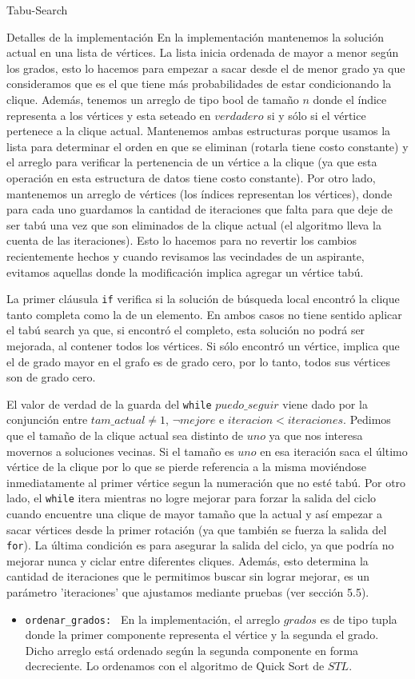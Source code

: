 \begin{section}{Tabu-Search}
\begin{subsection}{Detalles de la implementación}
		En la implementación mantenemos la solución actual en una lista de vértices. La lista inicia ordenada de mayor a menor según los grados, esto lo hacemos para empezar a sacar desde el de menor grado ya que consideramos que es el que tiene más probabilidades de estar condicionando la clique. Además, tenemos un arreglo de tipo bool de tamaño $n$ donde el índice representa a los vértices y esta seteado en $verdadero$ si y sólo si el vértice pertenece a la clique actual. Mantenemos ambas estructuras porque usamos la lista para determinar el orden en que se eliminan (rotarla tiene costo constante) y el arreglo para verificar la pertenencia de un vértice a la clique (ya que esta operación en esta estructura de datos tiene costo constante).
		Por otro lado, mantenemos un arreglo de vértices (los índices representan los vértices), donde para cada uno guardamos la cantidad de iteraciones que falta para que deje de ser tabú una vez que son eliminados de la clique actual (el algoritmo lleva la cuenta de las iteraciones). Esto lo hacemos para no revertir los cambios recientemente hechos y cuando revisamos las vecindades de un aspirante, evitamos aquellas donde la modificación implica agregar un vértice tabú.

		La primer cláusula \texttt{if} verifica si la solución de búsqueda local encontró la clique tanto completa como la de un elemento. En ambos casos no tiene sentido aplicar el tabú search ya que, si encontró el completo, esta solución no podrá ser mejorada, al contener todos los vértices. Si sólo encontró un vértice, implica que el de grado mayor en el grafo es de grado cero, por lo tanto, todos sus vértices son de grado cero.

		El valor de verdad de la guarda del \texttt{while} $puedo\_seguir$ viene dado por la conjunción entre $tam\_actual \neq 1$, $\neg mejore$ e $iteracion<iteraciones$.
		Pedimos que el tamaño de la clique actual sea distinto de $uno$ ya que nos interesa movernos a soluciones vecinas. Si el tamaño es $uno$ en esa iteración saca el último vértice de la clique por lo que se pierde referencia a la misma moviéndose inmediatamente al primer vértice segun la numeración que no esté tabú.
		Por otro lado, el \texttt{while} itera mientras no logre mejorar para forzar la salida del ciclo cuando encuentre una clique de mayor tamaño que la actual y así empezar a sacar vértices desde la primer rotación (ya que también se fuerza la salida del \texttt{for}).
		La última condición es para asegurar la salida del ciclo, ya que podría no mejorar nunca y ciclar entre diferentes cliques. Además, esto determina la cantidad de iteraciones que le permitimos buscar sin lograr mejorar, es un parámetro 'iteraciones' que ajustamos mediante pruebas (ver sección 5.5).
		\begin{itemize}
			\item \texttt{ordenar\_grados: } En la implementación, el arreglo $grados$ es de tipo tupla donde la primer componente representa el vértice y la segunda el grado. Dicho arreglo está ordenado según la segunda componente en forma decreciente. Lo ordenamos con el algoritmo de Quick Sort de $STL$.
				

\end{itemize}
\end{subsection}
\end{section}
